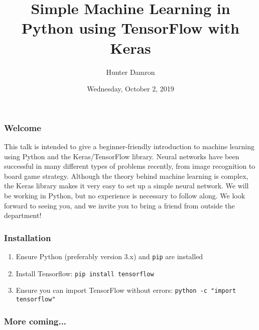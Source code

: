 \documentclass{beamer}
\title{Simple Machine Learning in Python using TensorFlow with Keras}
\author{Hunter Damron}
\date{Wednesday, October 2, 2019}
\institute[UofSC ACM]{Association for Computing Machinery -- University of South Carolina}
\begin{document}
	\maketitle
	\begin{frame}
		\frametitle{Welcome}
		This talk is intended to give a beginner-friendly introduction to machine learning using Python and the Keras/TensorFlow library. Neural networks have been successful in many different types of problems recently, from image recognition to board game strategy. Although the theory behind machine learning is complex, the Keras library makes it very easy to set up a simple neural network. We will be working in Python, but no experience is necessary to follow along. We look forward to seeing you, and we invite you to bring a friend from outside the department! 
	\end{frame}
	\begin{frame}
		\frametitle{Installation}
		\begin{enumerate}
			\item Ensure Python (preferably version 3.x) and \lstinline|pip| are installed
			\item Install Tensorflow: \lstinline|pip install tensorflow|
			\item Ensure you can import TensorFlow without errors: \lstinline|python -c "import tensorflow"|
		\end{enumerate}
	\end{frame}
	\begin{frame}
		\frametitle{More coming...}
	\end{frame}
\end{document}
